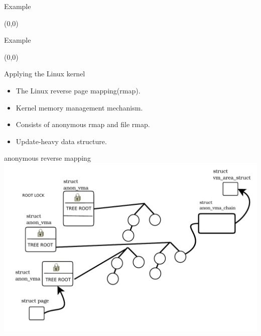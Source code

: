 \documentclass[english]{beamer} %
\begin{document}
\begin{frame}{Example}
\begin{textblock}{1}(0,0)
\end{textblock}
\end{frame}

\begin{frame}{Example}
\begin{textblock}{1}(0,0)
\end{textblock}
\end{frame}


\begin{frame}{Applying the Linux kernel}
    \begin{itemize}[<+-| alert@+>]
    \item The Linux reverse page mapping(rmap).
    \item Kernel memory management mechanism.
    \item Consists of anonymous rmap and file rmap.
    \item Update-heavy data structure.
    \end{itemize}
\end{frame}

\begin{frame}{anonymous reverse mapping}
\includegraphics[scale=0.5]{fig/anon_vma_default_0}
\end{frame}
\end{document}
